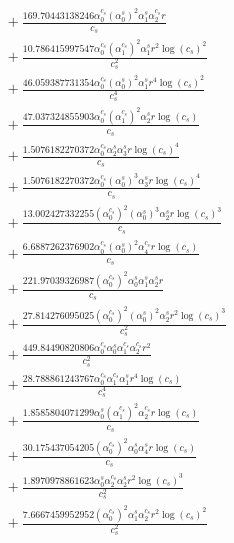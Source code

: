 \documentclass[10pt]{article}
\begin{document}
\begin{align*}
&{}  + \frac{169.70443138246 \alpha_{0}^{c_s} \left(\alpha_{0}^s\right)^{2} \alpha_{1}^s \alpha_{2}^{c_s} r}{c_{s}} \\
&{}  + \frac{10.786415997547 \alpha_{0}^{c_s} \left(\alpha_{1}^{c_s}\right)^{2} \alpha_{1}^s r^{2} \log{\left(c_{s} \right)}^{2}}{c_{s}^{2}} \\
&{}  + \frac{46.059387731354 \alpha_{0}^{c_s} \left(\alpha_{0}^s\right)^{2} \alpha_{1}^s r^{4} \log{\left(c_{s} \right)}^{2}}{c_{s}^{4}} \\
&{}  + \frac{47.037324855903 \alpha_{0}^{c_s} \left(\alpha_{1}^{c_s}\right)^{2} \alpha_{2}^s r \log{\left(c_{s} \right)}}{c_{s}} \\
&{}  + \frac{1.5076182270372 \alpha_{0}^{c_s} \alpha_{2}^s \alpha_{3}^s r \log{\left(c_{s} \right)}^{4}}{c_{s}} \\
&{}  + \frac{1.5076182270372 \alpha_{0}^{c_s} \left(\alpha_{0}^s\right)^{3} \alpha_{3}^s r \log{\left(c_{s} \right)}^{4}}{c_{s}} \\
&{}  + \frac{13.002427332255 \left(\alpha_{0}^{c_s}\right)^{2} \left(\alpha_{0}^s\right)^{3} \alpha_{2}^s r \log{\left(c_{s} \right)}^{3}}{c_{s}} \\
&{}  + \frac{6.6887262376902 \alpha_{0}^{c_s} \left(\alpha_{0}^s\right)^{2} \alpha_{4}^{c_s} r \log{\left(c_{s} \right)}}{c_{s}} \\
&{}  + \frac{221.97039326987 \left(\alpha_{0}^{c_s}\right)^{2} \alpha_{0}^s \alpha_{1}^s \alpha_{2}^s r}{c_{s}} \\
&{}  + \frac{27.814276095025 \left(\alpha_{0}^{c_s}\right)^{2} \left(\alpha_{0}^s\right)^{2} \alpha_{2}^s r^{2} \log{\left(c_{s} \right)}^{3}}{c_{s}^{2}} \\
&{}  + \frac{449.84490820806 \alpha_{0}^{c_s} \alpha_{0}^s \alpha_{1}^{c_s} \alpha_{2}^{c_s} r^{2}}{c_{s}^{2}} \\
&{}  + \frac{28.788861243767 \alpha_{0}^{c_s} \alpha_{1}^{c_s} \alpha_{1}^s r^{4} \log{\left(c_{s} \right)}}{c_{s}^{4}} \\
&{}  + \frac{1.8585804071299 \alpha_{0}^s \left(\alpha_{1}^{c_s}\right)^{2} \alpha_{2}^{c_s} r \log{\left(c_{s} \right)}}{c_{s}} \\
&{}  + \frac{30.175437054205 \left(\alpha_{0}^{c_s}\right)^{2} \alpha_{0}^s \alpha_{4}^s r \log{\left(c_{s} \right)}}{c_{s}} \\
&{}  + \frac{1.8970978861623 \alpha_{0}^s \alpha_{2}^{c_s} \alpha_{2}^s r^{2} \log{\left(c_{s} \right)}^{3}}{c_{s}^{2}} \\
&{}  + \frac{7.6667459952952 \left(\alpha_{0}^{c_s}\right)^{2} \alpha_{1}^s \alpha_{2}^{c_s} r^{2} \log{\left(c_{s} \right)}^{2}}{c_{s}^{2}} \\

\end{align*}
\end{document}
